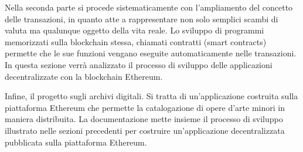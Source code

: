 Nella seconda parte si procede sistematicamente con l’ampliamento del concetto delle transazioni, in quanto atte a rappresentare non solo semplici scambi di valuta ma qualunque oggetto della vita reale. Lo sviluppo di programmi memorizzati sulla blockchain stessa, chiamati contratti (smart contracts) permette che le sue funzioni vengano eseguite automaticamente nelle transazioni. In questa sezione verrà analizzato il processo di sviluppo delle applicazioni decentralizzate con la blockchain Ethereum.

Infine, il progetto sugli archivi digitali. Si tratta di un’applicazione costruita sulla piattaforma Ethereum che permette la catalogazione di opere d’arte minori in maniera distribuita. La documentazione mette insieme il processo di sviluppo illustrato nelle sezioni precedenti per costruire un’applicazione decentralizzata pubblicata sulla piattaforma Ethereum.